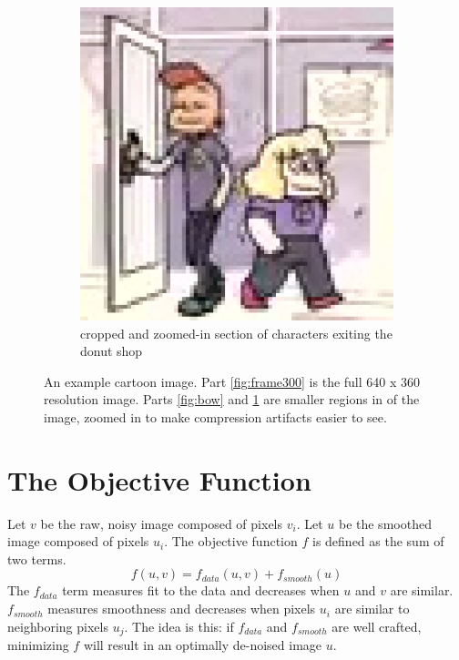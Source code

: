 \documentclass[10pt,twocolumn,letterpaper]{article}
\begin{document}
\begin{figure}
\begin{subfigure}{.5\textwidth}
  \includegraphics[width=\linewidth]{sady_lars_large.png}
  \caption{cropped and zoomed-in section of characters exiting the donut shop}
  \label{fig:sadylars}
\end{subfigure}
\caption{An example cartoon image. Part \ref{fig:frame300} is the full 640 x 360 resolution image. Parts \ref{fig:bow} and \ref{fig:sadylars} are smaller regions in of the image, zoomed in to make compression artifacts easier to see.}
\label{fig:origcartoon}
\end{figure}

\section{The Objective Function}

Let $v$ be the raw, noisy image composed of pixels $v_i$. Let $u$ be the smoothed image composed of pixels $u_i$. The objective function $f$ is defined as the sum of two terms.
$$
	f(u, v) = f_{data}(u, v) + f_{smooth}(u)
$$
The $f_{data}$ term measures fit to the data and decreases when $u$ and $v$ are similar. $f_{smooth}$ measures smoothness and decreases when pixels $u_i$ are similar to neighboring pixels $u_j$. The idea is this: if $f_{data}$ and $f_{smooth}$ are well crafted, minimizing $f$ will result in an optimally de-noised image $u$.
\end{document}
